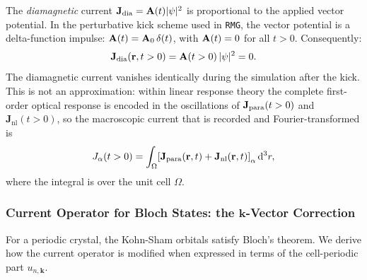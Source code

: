The \emph{diamagnetic} current $\mathbf{J}_{\mathrm{dia}} = \mathbf{A}(t)|\psi|^2$ is
proportional to the applied vector potential.
In the perturbative kick scheme used in \texttt{RMG},%
\cite{yabana-bertsch-1996,jakowski-rmg-tddft-2025}
the vector potential is a delta-function impulse:
$\mathbf{A}(t) = \mathbf{A}_0\,\delta(t)$, with $\mathbf{A}(t) = 0$ for all
$t > 0$.
Consequently:
\begin{equation}
  \mathbf{J}_{\mathrm{dia}}(\mathbf{r},t>0) = \mathbf{A}(t>0)\,|\psi|^2 = 0.
  \label{eq:Jdia-zero}
\end{equation}
The diamagnetic current vanishes identically during the simulation
after the kick.
This is not an approximation: within linear response theory the
complete first-order optical response is encoded in the oscillations
of $\mathbf{J}_{\mathrm{para}}(t>0)$ and $\mathbf{J}_\mathrm{nl}(t>0)$,%
\cite{yabana-bertsch-1996}
so the macroscopic current that is recorded and Fourier-transformed
is
\begin{equation}
  J_\alpha(t>0)
  = \int_\Omega\!
    \left[\mathbf{J}_{\mathrm{para}}(\mathbf{r},t)
    + \mathbf{J}_{\mathrm{nl}}(\mathbf{r},t)\right]_\alpha
    \mathrm{d}^3r,
  \label{eq:J-sim}
\end{equation}
where the integral is over the unit cell $\Omega$.

\subsubsection{Current Operator for Bloch States:
  the $\mathbf{k}$-Vector Correction}
\label{sec:current-bloch}

For a periodic crystal, the Kohn-Sham orbitals satisfy Bloch's
theorem.
We derive how the current operator is modified when expressed in
terms of the cell-periodic part $u_{n,\mathbf{k}}$.


